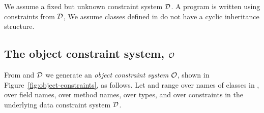 \documentclass[preprint,nocopyrightspace,9pt]{sigplanconf}
\begin{document}
We assume a fixed but unknown constraint system ${\cal D}$.
A program  is written using constraints from ${\cal D}$,
We assume classes defined in  do not have a cyclic
inheritance structure.


\subsection{
The object constraint system, ${\cal O}$
}

From  and ${\cal D}$
we generate an \emph{object constraint system} ${\cal O}$, shown
in Figure~\ref{fig:object-constraints},
as follows.  Let  and  range over names of classes
in ,  over field names,  over method names,
 over types, and  over constraints in the
underlying data constraint system ${\cal D}$.
\end{document}
